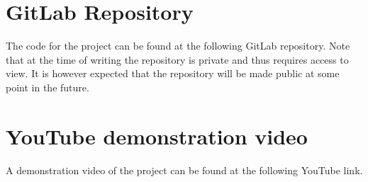 \documentclass[ twoside,openright,titlepage,numbers=noenddot,headinclude,%
                footinclude=true,cleardoublepage=empty,abstractoff, %
                BCOR=5mm,paper=a4,fontsize=11pt,%
                ngerman,american,%
                ]{scrreprt}
\begin{document}
\section{GitLab Repository}
The code for the project can be found at the following GitLab repository. Note that at the time of writing the repository is private and thus requires access to view. It is however expected that the repository will be made public at some point in the future.\\

\section{YouTube demonstration video}
A demonstration video of the project can be found at the following YouTube link.\\




\cleardoublepage

\end{document}
